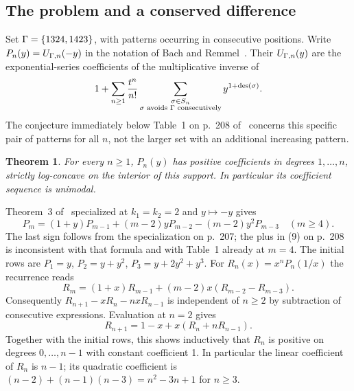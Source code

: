 \documentclass[11pt,a4paper]{article}
\newtheorem{SourceRcaTtheorem}{Theorem}
\begin{document}
\subsection{The problem and a conserved difference}
Set $\Gamma=\{1324,1423\}$, with patterns occurring in consecutive positions. Write $P_n(y)=U_{\Gamma,n}(-y)$ in the notation of Bach and Remmel~\cite{R20T:BR}. Their $U_{\Gamma,n}(y)$ are the exponential-series coefficients of the multiplicative inverse of
\[
1+\sum_{n\ge1}\frac{t^n}{n!}\sum_{\substack{\sigma\in S_n\\\text{$\sigma$ avoids $\Gamma$ consecutively}}} y^{1+\operatorname{des}(\sigma)} .
\]
The conjecture immediately below Table~1 on p.~208 of~\cite{R20T:BR} concerns this specific pair of patterns for all $n$, not the larger set with an additional increasing pattern.
\begin{SourceRcaTtheorem}
For every $n\ge1$, $P_n(y)$ has positive coefficients in degrees $1,\ldots,n$, strictly log-concave on the interior of this support. In particular its coefficient sequence is unimodal.
\end{SourceRcaTtheorem}
Theorem~3 of~\cite{R20T:BR} specialized at $k_1=k_2=2$ and $y\mapsto-y$ gives
\[
 P_m=(1+y)P_{m-1}+(m-2)yP_{m-2}-(m-2)y^2P_{m-3}\quad(m\ge4).
\]
The last sign follows from the specialization on p.~207; the plus in (9) on p.~208 is inconsistent with that formula and with Table~1 already at $m=4$.
The initial rows are $P_1=y$, $P_2=y+y^2$, $P_3=y+2y^2+y^3$.
For $R_n(x)=x^nP_n(1/x)$ the recurrence reads
\[
 R_m=(1+x)R_{m-1}+(m-2)x(R_{m-2}-R_{m-3}).
\]
Consequently $R_{n+1}-xR_n-nxR_{n-1}$ is independent of $n\ge2$ by subtraction of consecutive expressions. Evaluation at $n=2$ gives
\begin{equation}
 R_{n+1}=1-x+x(R_n+nR_{n-1}) .\label{R20T:first}
\end{equation}
Together with the initial rows, this shows inductively that $R_n$ is positive on degrees $0,\ldots,n-1$ with constant coefficient 1. In particular the linear coefficient of $R_n$ is $n-1$; its quadratic coefficient is $(n-2)+(n-1)(n-3)=n^2-3n+1$ for $n\ge3$.
\end{document}
